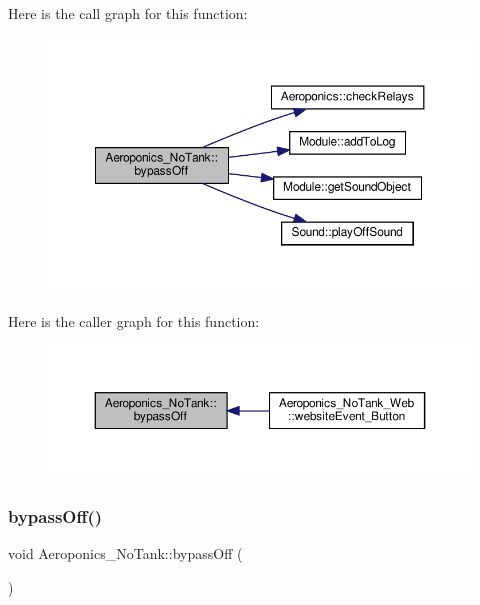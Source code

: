 Here is the call graph for this function\+:
\nopagebreak
\begin{figure}[H]
\begin{center}
\leavevmode
\includegraphics[width=350pt]{class_aeroponics___no_tank_a5b6d9ce2f5eb4bdfa1eae495a7d1c5d7_cgraph}
\end{center}
\end{figure}
Here is the caller graph for this function\+:
\nopagebreak
\begin{figure}[H]
\begin{center}
\leavevmode
\includegraphics[width=350pt]{class_aeroponics___no_tank_a5b6d9ce2f5eb4bdfa1eae495a7d1c5d7_icgraph}
\end{center}
\end{figure}
\mbox{\label{class_aeroponics___no_tank_a5b6d9ce2f5eb4bdfa1eae495a7d1c5d7}} 
\subsubsection{\texorpdfstring{bypass\+Off()}{bypassOff()}\hspace{0.1cm}{\footnotesize\ttfamily [2/2]}}
{\footnotesize\ttfamily void Aeroponics\+\_\+\+No\+Tank\+::bypass\+Off (\begin{DoxyParamCaption}{ }\end{DoxyParamCaption})\hspace{0.3cm}{\ttfamily [protected]}}

